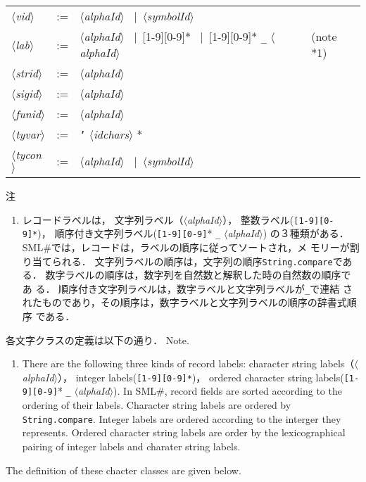 \documentclass{jbook}
\newcommand{\txt}[2]{#2}
\newcommand{\smlsharp}{SML\#}
\newcommand{\code}[1]{\mbox{\large\tt #1}}
\newcommand{\vbar}{\mbox{\ $|$\ }}
\newcommand{\nonterm}[1]{\mbox{$\langle$}{\it #1}\mbox{$\rangle$}}
\newcommand{\term}[1]{\mbox{{\tt #1}}}
\begin{document}
\begin{description}
\begin{center}
\begin{tabular}{lcll}
\nonterm{vid} &:=& \nonterm{alphaId} \vbar \nonterm{symbolId}
\\
\nonterm{lab} &:=& \nonterm{alphaId}
 \vbar [1-9][0-9]* \vbar [1-9][0-9]* \term{\_} \nonterm{alphaId}
                 & \txt{（注1）}{(note *1)}
\\
\nonterm{strid} &:=& \nonterm{alphaId} 
\\
\nonterm{sigid} &:=& \nonterm{alphaId} 
\\
\nonterm{funid} &:=& \nonterm{alphaId} 
\\
\nonterm{tyvar} &:=& \term{'} \nonterm{idchars} *
\\
\nonterm{tycon} &:=& \nonterm{alphaId} \vbar \nonterm{symbolId}
\end{tabular}
\end{center}%

\ifjp%
注
\begin{enumerate}
\item 
	レコードラベルは，
文字列ラベル（\nonterm{alphaId}），
整数ラベル(\term{[1-9][0-9]*})，
順序付き文字列ラベル(\term{[1-9][0-9]}* \code{\_} \nonterm{alphaId})
の３種類がある．
	\smlsharp{}では，レコードは，ラベルの順序に従ってソートされ，メ
モリーが割り当てられる．
	文字列ラベルの順序は，文字列の順序\code{String.compare}である．
	数字ラベルの順序は，数字列を自然数と解釈した時の自然数の順序であ
る．
	順序付き文字列ラベルは，数字ラベルと文字列ラベルが\verb|_|で連結
されたものであり，その順序は，数字ラベルと文字列ラベルの順序の辞書式順序
である．
\end{enumerate}
	各文字クラスの定義は以下の通り．
\else%
Note.
\begin{enumerate}
\item 
	There are the following three kinds of record labels:
character string labels（\nonterm{alphaId}），
integer labels(\term{[1-9][0-9]*})，
ordered character string labels(\term{[1-9][0-9]}* \code{\_} \nonterm{alphaId}).
	In \smlsharp{}, record fields are sorted according to the
ordering of their labels.
	Character string labels are ordered by \code{String.compare}.
	Integer labels are ordered according to the interger they represents.
	Ordered character string labels are order by the lexicographical
pairing of integer labels and charater string labels.
\end{enumerate}
	The definition of these chacter classes are given below.
\fi%


\end{description}
\end{document}
